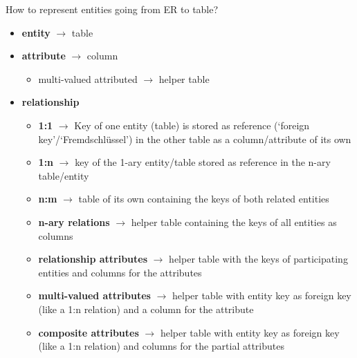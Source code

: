 \begin{frame}{How to represent entities going from ER to table?}
    \begin{itemize}
        \item \textbf{entity} $\to$ table
        \item \textbf{attribute} $\to$ column
        \begin{itemize}
            \item multi-valued attributed $\to$ helper table
        \end{itemize}
        \item \textbf{relationship}
            \begin{itemize}\footnotesize
                \item \textbf{1:1} $\to$ Key of one entity (table) is stored as reference (`foreign key'/`Fremdschlüssel') in the other table as a column/attribute of its own 
                \item \textbf{1:n} $\to$ key of the 1-ary entity/table stored as reference in the n-ary table/entity 
                \item \textbf{n:m} $\to$ table of its own containing the keys of both related entities
                \item \textbf{n-ary relations} $\to$ helper table containing the keys of all entities as columns 
                \item \textbf{relationship attributes} $\to$ helper table with the keys of participating entities and columns for the attributes 
                \item \textbf{multi-valued attributes} $\to$ helper table with entity key as foreign key (like a 1:n relation) and a column for the attribute 
                \item \textbf{composite attributes} $\to$ helper table with entity key as foreign key (like a 1:n relation) and columns for the partial attributes 
            \end{itemize}
    \end{itemize}
\end{frame}

